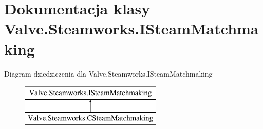 \hypertarget{class_valve_1_1_steamworks_1_1_i_steam_matchmaking}{}\section{Dokumentacja klasy Valve.\+Steamworks.\+I\+Steam\+Matchmaking}
\label{class_valve_1_1_steamworks_1_1_i_steam_matchmaking}
Diagram dziedziczenia dla Valve.\+Steamworks.\+I\+Steam\+Matchmaking\begin{figure}[H]
\begin{center}
\leavevmode
\includegraphics[height=2.000000cm]{class_valve_1_1_steamworks_1_1_i_steam_matchmaking}
\end{center}
\end{figure}
